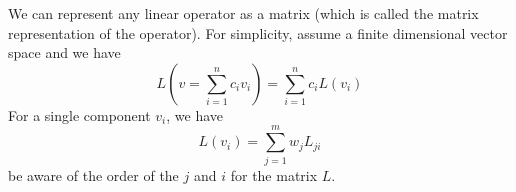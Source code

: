\vspace{2ex}
\begin{rmk}
We can represent any linear operator as a matrix (which is called the matrix representation of the operator). For simplicity, assume a finite dimensional vector space and we have 
\[L(v=\sum ^{n}_{i=1}c_{i}v_{i})=\sum ^{n}_{i=1}c_{i}L(v_{i})\]
For a single component $v_{i}$, we have
\[L(v_{i})=\sum ^{m}_{j=1}w_{j}L_{ji}\]
be aware of the order of the $j$ and $i$ for the matrix $L$. 
\end{rmk}
\vspace{2ex}

